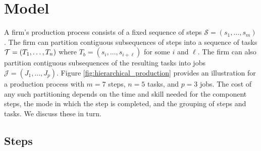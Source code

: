 \section{Model}

A firm's production process consists of a fixed sequence of steps $\mathcal{S}=(s_1,\ldots,s_m)$.
The firm can partition contiguous subsequences of steps into a sequence of tasks $\mathcal{T}=(T_1,\ldots,T_n)$ where $T_b=(s_i,\ldots,s_{i+\ell})$ for some $i$ and $\ell$.
The firm can also partition contiguous subsequences of the resulting tasks into jobs $\mathcal{J}=(J_1,\ldots,J_p)$.
Figure \ref{fig:hierarchical_production} provides an illustration for a production process with $m=7$ steps, $n=5$ tasks, and $p=3$ jobs.
The cost of any such partitioning depends on the time and skill needed for the component steps, the mode in which the step is completed, and the grouping of steps and tasks.
We discuss these in turn.
  
%   
  




\subsection{Steps}
\label{sec:model.steps}

